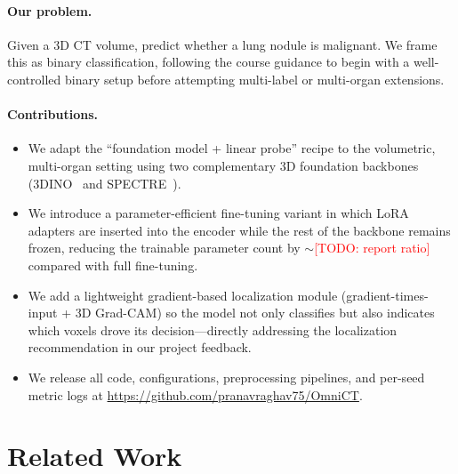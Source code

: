 \documentclass{article}
\newcommand{\TODO}[1]{\textcolor{red}{[TODO: #1]}}
\begin{document}
\paragraph{Our problem.} Given a 3D CT volume, predict whether a lung
nodule is malignant. We frame this as binary classification, following
the course guidance to begin with a well-controlled binary setup before
attempting multi-label or multi-organ extensions.

\paragraph{Contributions.}
\begin{itemize}
\item We adapt the \citet{pai2024_cancer_fm} ``foundation model + linear
  probe'' recipe to the volumetric, multi-organ setting using two
  complementary 3D foundation backbones (3DINO~\citep{xu2025_3dino} and
  SPECTRE~\citep{claessens2025_spectre}).
\item We introduce a parameter-efficient fine-tuning variant in which
  LoRA~\citep{hu2022_lora} adapters are inserted into the encoder while
  the rest of the backbone remains frozen, reducing the trainable
  parameter count by $\sim$\TODO{report ratio} compared with full
  fine-tuning.
\item We add a lightweight gradient-based localization module
  (gradient-times-input + 3D Grad-CAM) so the model not only classifies
  but also indicates which voxels drove its decision---directly
  addressing the localization recommendation in our project feedback.
\item We release all code, configurations, preprocessing pipelines, and
  per-seed metric logs at
  \url{https://github.com/pranavraghav75/OmniCT}.
\end{itemize}

\section{Related Work}
\end{document}
